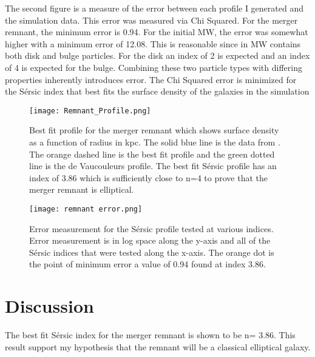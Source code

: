 \documentclass[fleqn,usenatbib]{mnras}
\begin{document}
The second figure is a measure of the error between each profile I generated and the simulation data. This error was measured via Chi Squared. For the merger remnant, the minimum error is 0.94. For the initial MW, the error was somewhat higher with a minimum error of 12.08. This is reasonable since in MW contains both disk and bulge particles. For the disk an index of 2 is expected and an index of 4 is expected for the bulge. Combining these two particle types with differing properties inherently introduces error. The Chi Squared error is minimized for the S\'ersic index that best fits the surface density of the galaxies in the simulation 

\begin{figure}
	\texttt{[image: Remnant\_Profile.png]}
    \caption{Best fit profile for the merger remnant which shows surface density as a function of radius in kpc. The solid blue line is the data from \citep{simulation}. The orange dashed line is the best fit profile and the green dotted line is the de Vaucouleurs profile. The best fit S\'ersic profile has an index of 3.86 which is sufficiently close to n=4 to prove that the merger remnant is elliptical. }
    \label{fig:RemnantProfile}
\end{figure}



\begin{figure}
	\texttt{[image: remnant error.png]}
    \caption{Error measurement for the S\'ersic profile tested at various indices. Error measurement is in log space along the y-axis and all of the S\'ersic indices that were tested along the x-axis. The orange dot is the point of minimum error a value of 0.94 found at index 3.86.}
    \label{fig:RemnantError}
\end{figure}


\section{Discussion}
The best fit S\'ersic index for the merger remnant is shown to be n= 3.86.  This result support my hypothesis that the remnant will be a classical elliptical galaxy. 
\end{document}
